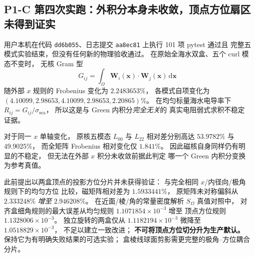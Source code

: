 \subsection{P1-C 第四次实跑：外积分本身未收敛，顶点方位扇区未得到证实}
\label{sec:p1-c-outer-gram-separation}
用户本机在代码 \texttt{dd6b055}、日志提交
\texttt{aa8ec81} 上执行 101 项 pytest 通过且
完整五模式实验结束，但没有任何新的物理验收通过。
在原始全海水双盒、五个 curl 模态不变时，
无核 Gram 型
\[
G_{ij}=\int_\Omega\bm W_i(\bm x)\cdot
\bm W_j(\bm x)\,\mathrm d\bm x
\]
随外部 $x$ 规则的 Frobenius 变化为 $2.2483653\%$，
各模式自项变化为
$(4.10099,2.98653,4.10099,2.98653,2.20865)\%$。
在均匀标量海水电导率下
$R_{ij}=G_{ij}/\sigma_{\mathrm{sea}}$，
所以这是与 Green 内积分\emph{完全无关}的
真实电阻弱式求积不稳定证据。

对于同一 $x$ 单轴变化，
原核五模态 $L_{00}$ 与 $L_{22}$
相对差分别高达 $53.9782\%$ 与 $49.9025\%$，
而全矩阵 Frobenius 相对变化仅 $1.841\%$。
因此磁核自身同样仍有明显的不稳定，
但无法在外部 $x$ 积分未收敛前据此判定
哪一个 Green 内积分变换为参考真值。

此前提出以两盒顶点的投影方位分片并未获得验证：
与完全相同 $x$/内径向/极角规则下的均匀方位
比较，磁矩阵相对差为 $1.5933441\%$，
原矩阵未对称偏斜从 $2.333248\%$
\emph{增至} $2.946208\%$。
在近面/棱/角的常量密度解析 $S_\Omega$
真值对照中，
对齐盒细角规则的最大误差从均匀规则
$1.1071854\times10^{-3}$ 增至
顶点方位规则 $1.1328006\times10^{-3}$。
独立旋转的两盒仅从
$1.1182194\times10^{-3}$ 微降至
$1.0518829\times10^{-3}$，
不足以建立一致改进；
\textbf{不可将顶点方位切分升为生产默认。}
保持它为有明确失败结果的可选实验；
盒棱线球面剪影需更完整的极角--方位耦合分片。

